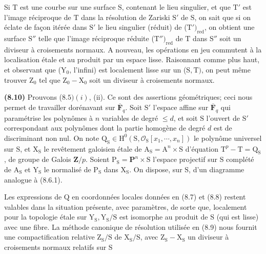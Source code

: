 \documentclass[10pt,leqno]{article}
\begin{document}
\clearpage

\label{physical-34}\par\smallskip

\noindent Si \(\mathrm{T}\) est une courbe sur une surface \(\mathrm{S}\), contenant le lieu singulier, et que \(\mathrm{T}'\) est l'image réciproque de \(\mathrm{T}\) dans la résolution de Zariski \(\mathrm{S}'\) de \(\mathrm{S}\), on sait que si on éclate de façon itérée dans \(\mathrm{S}'\) le lieu singulier (réduit) de (\(\mathrm{T}')_{\mathrm{red}}\), on obtient une surface \(\mathrm{S}''\) telle que l'image réciproque réduite (\(\mathrm{T}'')_{\mathrm{red}}\) de \(\mathrm{T}\) dans \(\mathrm{S}''\) soit un diviseur à croisements normaux. \(\mathrm{A}\) nouveau, les opérations en jeu commutent à la localisation étale et au produit par un espace lisse. Raisonnant comme plus haut, et observant que (\(\mathrm{Y}_{0}\), l'infini) est localement lisse sur un (\(\mathrm{S},\mathrm{T})\), on peut même trouver \(\mathrm{Z}_{0}\) tel que \(\mathrm{Z}_{0}-\mathrm{X}_{0}\) soit un diviseur à croisements normaux.\par

\noindent \textbf{(8.10)} Prouvons (\(8.5) (i)\), (ii). Ce sont des assertions géométriques; ceci nous permet de travailler dorénavant sur \(\overline{\mathbf{F}}_{q}\). Soit \(\mathrm{S}'\) l'espace affine sur \(\overline{\mathbf{F}}_{q}\) qui paramétrise les polynômes à \(n\) variables de degré \(\leq  d\), et soit \(\mathrm{S}\) l'ouvert de \(\mathrm{S}'\) correspondant aux polynômes dont la partie homogène de degré \(d\) est de discriminant non nul. On note \(\mathrm{Q}_{\mathrm{S}} \in  \mathrm{H}^{0}(\mathrm{S},\mathcal{O}_{\mathrm{S}}[x_{1},\cdots ,x_{n}])\) le polynôme universel sur \(\mathrm{S}\), et \(\mathrm{X}_{\mathrm{S}}\) le revêtement galoisien étale de \(\mathrm{A}_{\mathrm{S}} = \mathrm{A}^{n} \times  \mathrm{S}\) d'équation \(\mathrm{T}^{p}-\mathrm{T} = \mathrm{Q}_{\mathrm{S}}\), de groupe de Galois \(\mathbf{Z}/p\). Soient \(\mathrm{P}_{\mathrm{S}} = \mathbf{P}^{n} \times  \mathrm{S}\) l'espace projectif sur \(\mathrm{S}\) complété de \(\mathrm{A}_{\mathrm{S}}\) et \(\mathrm{Y}_{\mathrm{S}}\) le normalisé de \(\mathrm{P}_{\mathrm{S}}\) dans \(\mathrm{X}_{\mathrm{S}}\). On dispose, sur \(\mathrm{S}\), d'un diagramme analogue à (8.6.1).\par

\noindent Les expressions de \(\mathrm{Q}\) en coordonnées locales données en (8.7) et (8.8) restent valables dans la situation présente, avec paramètres, de sorte que, localement pour la topologie étale sur \(\mathrm{Y}_{\mathrm{S}}, \mathrm{Y}_{\mathrm{S}}/\mathrm{S}\) est isomorphe au produit de \(\mathrm{S}\) (qui est lisse) avec une fibre. La méthode canonique de résolution utilisée en (8.9) nous fournit une compactification relative \(\mathrm{Z}_{\mathrm{S}}/\mathrm{S}\) de \(\mathrm{X}_{\mathrm{S}}/\mathrm{S}\), avec \(\mathrm{Z}_{\mathrm{S}}-\mathrm{X}_{\mathrm{S}}\) un diviseur à croisements normaux relatifs sur \(\mathrm{S}\)\par
\end{document}
